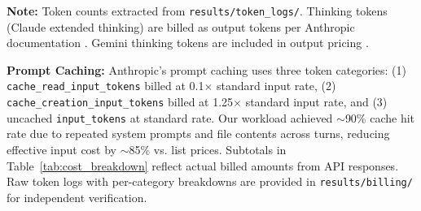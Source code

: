\documentclass[11pt,a4paper]{article}
\begin{document}
\begin{table}[h]
\centering
\caption{Cost Breakdown by Model Family (Pricing retrieved December 2025)}
\label{tab:cost_breakdown}
\end{table}

\textbf{Note:} Token counts extracted from \texttt{results/token\_logs/}. Thinking tokens (Claude extended thinking) are billed as output tokens per Anthropic documentation \citep{anthropic2024thinkingbilling}. Gemini thinking tokens are included in output pricing \citep{google2024geminipricing}. 

\textbf{Prompt Caching:} Anthropic's prompt caching uses three token categories: (1) \texttt{cache\_read\_input\_tokens} billed at 0.1$\times$ standard input rate, (2) \texttt{cache\_creation\_input\_tokens} billed at 1.25$\times$ standard input rate, and (3) uncached \texttt{input\_tokens} at standard rate. Our workload achieved $\sim$90\% cache hit rate due to repeated system prompts and file contents across turns, reducing effective input cost by $\sim$85\% vs. list prices. Subtotals in Table~\ref{tab:cost_breakdown} reflect actual billed amounts from API responses. Raw token logs with per-category breakdowns are provided in \texttt{results/billing/} for independent verification.
\end{document}
